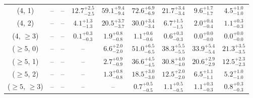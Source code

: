 \begin{table}[h!]
{\begin{tabular}{ccccccccc}
	(4, 1) & -- & -- & $12.7^{+ 2.5 }_{- 2.5 }$ & $59.1^{+ 9.4 }_{- 9.4 }$ & $72.6^{+ 6.9 }_{- 6.9 }$ & $21.7^{+ 3.4 }_{- 3.4 }$ & $9.6^{+ 1.7 }_{- 1.7 }$ & $4.5^{+ 1.0 }_{- 1.0 }$ \\[0.5ex] 
	(4, 2) & -- & -- & $4.1^{+ 1.3 }_{- 1.3 }$ & $20.5^{+ 3.7 }_{- 3.7 }$ & $30.0^{+ 3.4 }_{- 3.4 }$ & $6.7^{+ 1.5 }_{- 1.5 }$ & $2.0^{+ 0.4 }_{- 0.4 }$ & $1.1^{+ 0.3 }_{- 0.3 }$ \\[0.5ex] 
	(4, $\ge3$) & -- & -- & $0.1^{+ 0.3 }_{- 0.3 }$ & $1.9^{+ 0.8 }_{- 0.8 }$ & $1.1^{+ 0.6 }_{- 0.6 }$ & $0.6^{+ 0.3 }_{- 0.3 }$ & $0.0^{+ 0.0 }_{- 0.0 }$ & $0.0^{+ 0.0 }_{- 0.0 }$ \\[0.5ex] 
	($\ge5$, 0) & -- & -- & -- & $6.6^{+ 2.0 }_{- 2.0 }$ & $51.0^{+ 6.5 }_{- 6.5 }$ & $38.3^{+ 5.5 }_{- 5.5 }$ & $33.9^{+ 5.4 }_{- 5.4 }$ & $21.3^{+ 3.5 }_{- 3.5 }$ \\[0.5ex] 
	($\ge5$, 1) & -- & -- & -- & $2.7^{+ 0.9 }_{- 0.9 }$ & $36.6^{+ 4.5 }_{- 4.5 }$ & $30.8^{+ 4.0 }_{- 4.0 }$ & $20.6^{+ 2.9 }_{- 2.9 }$ & $12.5^{+ 2.3 }_{- 2.3 }$ \\[0.5ex] 
	($\ge5$, 2) & -- & -- & -- & $1.3^{+ 0.8 }_{- 0.8 }$ & $18.5^{+ 3.0 }_{- 3.0 }$ & $12.5^{+ 2.0 }_{- 2.0 }$ & $6.5^{+ 1.1 }_{- 1.1 }$ & $5.2^{+ 1.0 }_{- 1.0 }$ \\[0.5ex] 
	($\ge5$, $\ge3$) & -- & -- & -- & -- & $0.7^{+ 0.5 }_{- 0.5 }$ & $1.1^{+ 0.5 }_{- 0.5 }$ & $1.1^{+ 0.3 }_{- 0.3 }$ & $0.8^{+ 0.3 }_{- 0.3 }$ \\[0.5ex] 
	\hline
	\hline
\end{tabular}}
\end{table}
